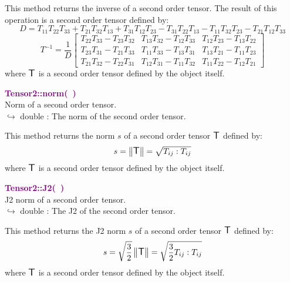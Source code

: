 This method returns the inverse of a second order tensor.
The result of this operation is a second order tensor defined by:
\begin{equation*}
D = T_{11} T_{22} T_{33} + T_{21} T_{32} T_{13} + T_{31} T_{12} T_{23} - T_{31} T_{22} T_{13} - T_{11} T_{32} T_{23} - T_{21} T_{12} T_{33}
\end{equation*}
\begin{equation*}
T^{-1} = \frac {1}{D} \left[\begin{array}{ccc}
  T_{22}T_{33}-T_{23}T_{32}&T_{13}T_{32}-T_{12}T_{33}&T_{12}T_{23}-T_{13}T_{22}\\
  T_{23}T_{31}-T_{21}T_{33}&T_{11}T_{33}-T_{13}T_{31}&T_{13}T_{21}-T_{11}T_{23}\\
  T_{21}T_{32}-T_{22}T_{31}&T_{12}T_{31}-T_{11}T_{32}&T_{11}T_{22}-T_{12}T_{21}
  \end{array}
  \right]
\end{equation*}
where $\mbox{\large\ensuremath{\mathsf{T}}}$ is a second order tensor defined by the object itself.

\textcolor{purple}{\textbf{Tensor2::norm(~)}}\label{Tensor2::norm()}\\
Norm of a second order tensor.\\ \hspace*{10mm}$\hookrightarrow$ double : The norm of the second order tensor.

This method returns the norm $s$ of a second order tensor $\mbox{\large\ensuremath{\mathsf{T}}}$ defined by:\begin{equation*}
s = \left\Vert \mbox{\large\ensuremath{\mathsf{T}}} \right\Vert  = \sqrt {T_{ij}:T_{ij}}
\end{equation*}
where $\mbox{\large\ensuremath{\mathsf{T}}}$ is a second order tensor defined by the object itself.

\textcolor{purple}{\textbf{Tensor2::J2(~)}}\label{Tensor2::J2()}\\
J2 norm of a second order tensor.\\ \hspace*{10mm}$\hookrightarrow$ double : The J2 of the second order tensor.

This method returns the J2 norm $s$ of a second order tensor $\mbox{\large\ensuremath{\mathsf{T}}}$ defined by:
\begin{equation*}
s = \sqrt {\frac{3}{2}} \left\Vert \mbox{\large\ensuremath{\mathsf{T}}} \right\Vert  = \sqrt {\frac{3}{2} T_{ij}:T_{ij}}
\end{equation*}
where $\mbox{\large\ensuremath{\mathsf{T}}}$ is a second order tensor defined by the object itself.

